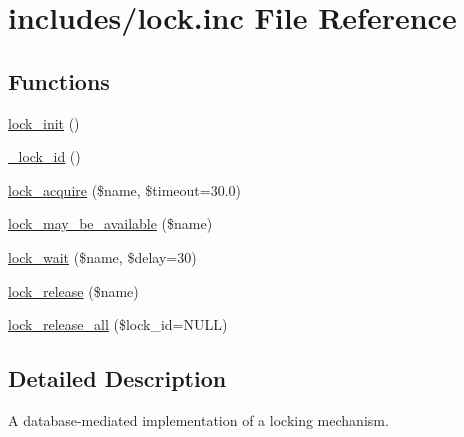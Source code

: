\hypertarget{lock_8inc}{
\section{includes/lock.inc File Reference}
\label{lock_8inc}
}
\subsection*{Functions}
\begin{CompactItemize}
\item 
\hyperlink{group__lock_g0d77cf7fc006fdcf8965ae2b682f90b9}{lock\_\-init} ()
\item 
\hyperlink{group__lock_g22f64c6b65bc54d5f8f981559b0cdf04}{\_\-lock\_\-id} ()
\item 
\hyperlink{group__lock_gc67a4b1061491f7a869646f47b66e998}{lock\_\-acquire} (\$name, \$timeout=30.0)
\item 
\hyperlink{group__lock_g095b65838e63b109f52ff6d8c00d8963}{lock\_\-may\_\-be\_\-available} (\$name)
\item 
\hyperlink{group__lock_g54c2ee771edac47614b8f12d949d3376}{lock\_\-wait} (\$name, \$delay=30)
\item 
\hyperlink{group__lock_g73e1456861f9aff1a506a650f43aceb0}{lock\_\-release} (\$name)
\item 
\hyperlink{group__lock_g290817e14e2a9ecc0bd34c6b7b0af031}{lock\_\-release\_\-all} (\$lock\_\-id=NULL)
\end{CompactItemize}


\subsection{Detailed Description}
A database-mediated implementation of a locking mechanism. 